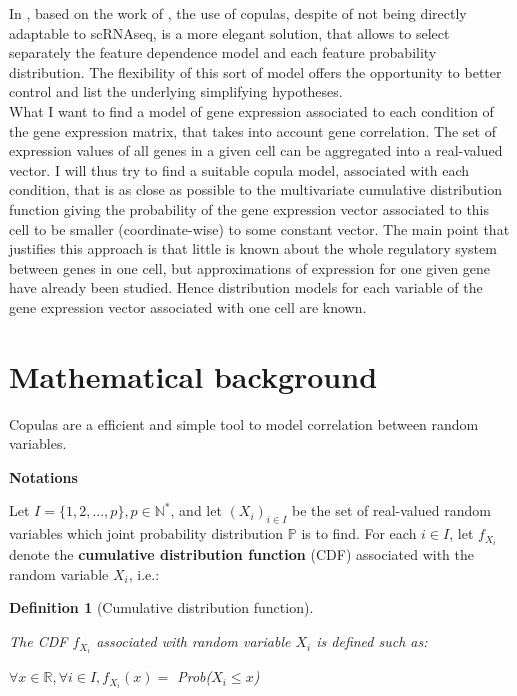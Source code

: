 \documentclass{report}
\newtheorem{definition}{Definition}[section]
\begin{document}
{In \cite{zhang2017classification}, based on the work of \cite{hee2014copula}, the use of copulas, despite of not being directly adaptable to scRNAseq, is a more elegant solution, that allows to select separately the feature dependence model and each feature probability distribution. The flexibility of this sort of model offers the opportunity to better control and list the underlying  simplifying hypotheses.\\

What I want to find a model of gene expression associated to each condition of the gene expression matrix, that takes into account gene correlation. The set of expression values of all genes in a given cell can be aggregated into a real-valued vector. I will thus try to find a suitable copula model, associated with each condition, that is as close as possible to the multivariate cumulative distribution function giving the probability of the gene expression vector associated to this cell to be smaller (coordinate-wise) to some constant vector. The main point that justifies this approach is that little is known about the whole regulatory system between genes in one cell, but approximations of expression for one given gene have already been studied. Hence distribution models for each variable of the gene expression vector associated with one cell are known.

\section{Mathematical background}

Copulas are a efficient and simple tool to model correlation between random variables. 

\bigskip
\noindent \textbf{Notations}
\bigskip

Let $I=\{1, 2, ..., p\}, p \in \mathbb{N^*}$, and let $(X_i)_{i \in I}$ be the set of real-valued random variables which joint probability distribution $\mathbb{P}$ is to find. For each $i \in I$, let $f_{X_i}$ denote the \textbf{cumulative distribution function} (CDF) associated with the random variable $X_i$, i.e.:

\begin{definition}[Cumulative distribution function]\label{cdf}{The CDF $f_{X_i}$ associated with random variable $X_i$ is defined such as:\begin{center} $\forall x \in \mathbb{R}, \forall i \in I, f_{X_i}(x) =$ \textit{Prob}($X_i \leq x$)\end{center}}\end{definition}

}
\end{document}
